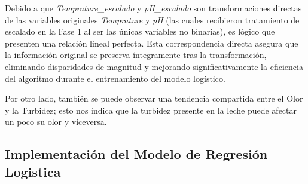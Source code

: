 \documentclass[12pt,a4paper]{article}
\begin{document}
	Debido a que \textit{Temprature\_escalado} y \textit{pH\_escalado} son transformaciones directas de las variables originales \textit{Temprature} y \textit{pH} (las cuales recibieron tratamiento de escalado en la Fase 1 al ser las únicas variables no binarias), es lógico que presenten una relación lineal perfecta. Esta correspondencia directa asegura que la información original se preserva íntegramente tras la transformación, eliminando disparidades de magnitud y mejorando significativamente la eficiencia del algoritmo durante el entrenamiento del modelo logístico.
	
	Por otro lado, también se puede observar una tendencia compartida entre el Olor y la Turbidez; esto nos indica que la turbidez presente en la leche puede afectar un poco su olor y viceversa.

\subsection{Implementación del Modelo de Regresión Logistica}
\end{document}
